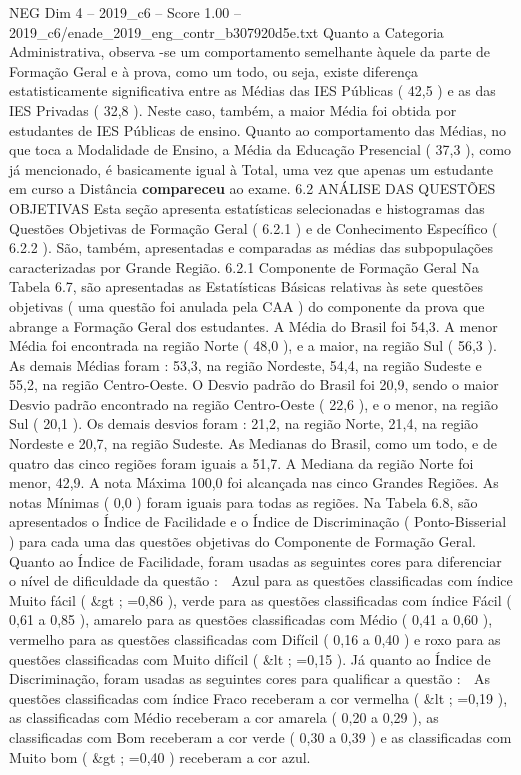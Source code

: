 \begin{textsample}{NEG Dim 4 – 2019\_c6 – Score 1.00 – 2019\_c6/enade\_2019\_eng\_contr\_b307920d5e.txt}
Quanto a Categoria Administrativa, observa -se um comportamento semelhante àquele da parte de Formação Geral e à prova, como um todo, ou seja, existe diferença estatisticamente significativa entre as Médias das IES Públicas ( 42,5 ) e as das IES Privadas ( 32,8 ).
Neste caso, também, a maior Média foi obtida por estudantes de IES Públicas de ensino.
Quanto ao comportamento das Médias, no que toca a Modalidade de Ensino, a Média da Educação Presencial ( 37,3 ), como já mencionado, é basicamente igual à Total, uma vez que apenas um estudante em curso a Distância \textbf{compareceu} ao exame. 6.2 ANÁLISE DAS QUESTÕES OBJETIVAS Esta seção apresenta estatísticas selecionadas e histogramas das Questões Objetivas de Formação Geral ( 6.2.1 ) e de Conhecimento Específico ( 6.2.2 ).
São, também, apresentadas e comparadas as médias das subpopulações caracterizadas por Grande Região. 6.2.1 Componente de Formação Geral Na Tabela 6.7, são apresentadas as Estatísticas Básicas relativas às sete questões objetivas ( uma questão foi anulada pela CAA ) do componente da prova que abrange a Formação Geral dos estudantes.
A Média do Brasil foi 54,3.
A menor Média foi encontrada na região Norte ( 48,0 ), e a maior, na região Sul ( 56,3 ).
As demais Médias foram : 53,3, na região Nordeste, 54,4, na região Sudeste e 55,2, na região Centro-Oeste.
O Desvio padrão do Brasil foi 20,9, sendo o maior Desvio padrão encontrado na região Centro-Oeste ( 22,6 ), e o menor, na região Sul ( 20,1 ).
Os demais desvios foram : 21,2, na região Norte, 21,4, na região Nordeste e 20,7, na região Sudeste.
As Medianas do Brasil, como um todo, e de quatro das cinco regiões foram iguais a 51,7.
A Mediana da região Norte foi menor, 42,9.
A nota Máxima 100,0 foi alcançada nas cinco Grandes Regiões.
As notas Mínimas ( 0,0 ) foram iguais para todas as regiões.
Na Tabela 6.8, são apresentados o Índice de Facilidade e o Índice de Discriminação ( Ponto-Bisserial ) para cada uma das questões objetivas do Componente de Formação Geral.
Quanto ao Índice de Facilidade, foram usadas as seguintes cores para diferenciar o nível de dificuldade da questão :  Azul para as questões classificadas com índice Muito fácil ( \&gt ; =0,86 ), verde para as questões classificadas com índice Fácil ( 0,61 a 0,85 ), amarelo para as questões classificadas com Médio ( 0,41 a 0,60 ), vermelho para as questões classificadas com Difícil ( 0,16 a 0,40 ) e roxo para as questões classificadas com Muito difícil ( \&lt ; =0,15 ).
Já quanto ao Índice de Discriminação, foram usadas as seguintes cores para qualificar a questão :  As questões classificadas com índice Fraco receberam a cor vermelha ( \&lt ; =0,19 ), as classificadas com Médio receberam a cor amarela ( 0,20 a 0,29 ), as classificadas com Bom receberam a cor verde ( 0,30 a 0,39 ) e as classificadas com Muito bom ( \&gt ; =0,40 ) receberam a cor azul.

\end{textsample}
